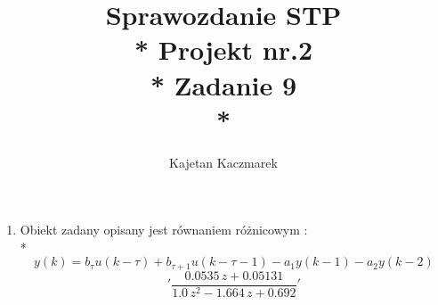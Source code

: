 \documentclass[a4paper, 11pt]{article}
\author{Kajetan Kaczmarek}
\begin{document}
\title{Sprawozdanie STP \\* Projekt nr.2 \\* 
Zadanie 9 \\*}
\maketitle
\begin{enumerate}
\item Obiekt zadany opisany jest równaniem różnicowym : \\*
\[  y(k) = b_{\tau}u(k-\tau) +  b_{\tau+1}u(k-\tau -1) -a_1y(k-1)-a_2y(k-2)  \]
\[    '\frac{0.0535\,z+0.05131}{1.0\,z^2-1.664\,z+0.692}' \]

\end{enumerate}
\end{document}
